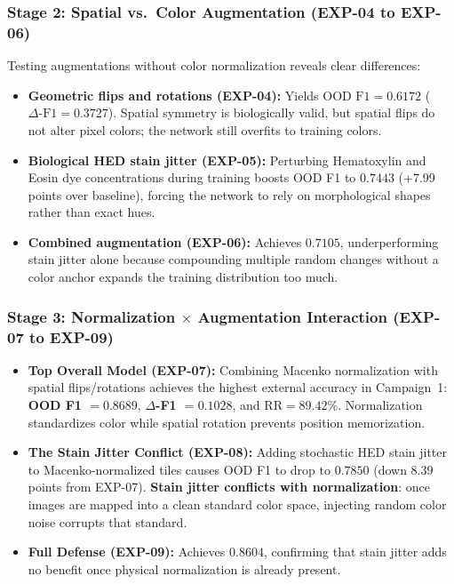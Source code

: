 \documentclass[11pt,a4paper]{article}
\begin{document}
\subsubsection*{Stage 2: Spatial vs.\ Color Augmentation (EXP-04 to EXP-06)}
Testing augmentations without color normalization reveals clear differences:
\begin{itemize}[leftmargin=*,itemsep=1pt]
  \item \textbf{Geometric flips and rotations (EXP-04):} Yields $\text{OOD F1} = 0.6172$ ($\Delta\text{-F1} = 0.3727$). Spatial symmetry is biologically valid, but spatial flips do not alter pixel colors; the network still overfits to training colors.
  \item \textbf{Biological HED stain jitter (EXP-05):} Perturbing Hematoxylin and Eosin dye concentrations during training boosts OOD F1 to $0.7443$ (+7.99 points over baseline), forcing the network to rely on morphological shapes rather than exact hues.
  \item \textbf{Combined augmentation (EXP-06):} Achieves $0.7105$, underperforming stain jitter alone because compounding multiple random changes without a color anchor expands the training distribution too much.
\end{itemize}

\subsubsection*{Stage 3: Normalization $\times$ Augmentation Interaction (EXP-07 to EXP-09)}
\begin{itemize}[leftmargin=*,itemsep=1pt]
  \item \textbf{Top Overall Model (EXP-07):} Combining Macenko normalization with spatial flips/rotations achieves the highest external accuracy in Campaign~1: \textbf{OOD F1 $= 0.8689$}, \textbf{$\Delta$-F1 $= 0.1028$}, and \textbf{$\text{RR} = 89.42\%$}. Normalization standardizes color while spatial rotation prevents position memorization.
  \item \textbf{The Stain Jitter Conflict (EXP-08):} Adding stochastic HED stain jitter to Macenko-normalized tiles causes OOD F1 to drop to $0.7850$ (down $8.39$ points from EXP-07). \textbf{Stain jitter conflicts with normalization}: once images are mapped into a clean standard color space, injecting random color noise corrupts that standard.
  \item \textbf{Full Defense (EXP-09):} Achieves $0.8604$, confirming that stain jitter adds no benefit once physical normalization is already present.
\end{itemize}
\end{document}

